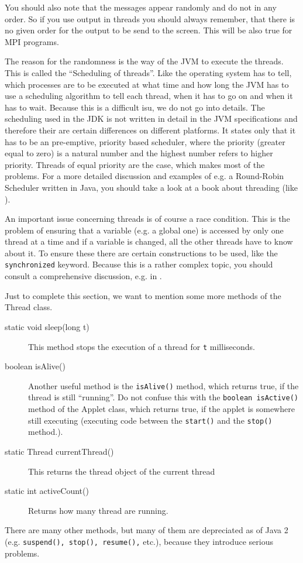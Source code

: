 You should also note that the messages appear randomly and do not in
any order. So if you use output in threads you should always remember,
that there is no given order for the output to be send to the screen. This
will be also true for MPI programs.

The reason for the randomness is the way of the JVM to execute the threads.
This is called the ``Scheduling of threads''. Like the operating
system has to tell, which processes are to be executed at what time
and how long the JVM has to use a scheduling algorithm to tell each
thread, when it has to go on and when it has to wait. Because this
is a difficult isu, we do not go into details. The scheduling used
in the JDK is not written in detail in the JVM specifications and therefore their
are certain differences on different platforms. It states only that it
has to be an pre-emptive, priority based scheduler, where the priority
(greater equal to zero) is a natural number and the highest number
refers to higher priority. Threads of equal priority are the case, which
makes most of the problems. For a more detailed discussion and examples
of e.g. a Round-Robin Scheduler written in Java,
you should take a look at a book about threading (like \cite[]{JavaThreads}).
 
An important issue concerning threads is of course a race condition. This 
is the problem of ensuring that a variable (e.g. a global one) is
accessed by only one thread at a time and if a variable is changed,
all the other threads have to know about it. To ensure these there
are certain constructions to be used, like the \verb|synchronized| keyword.
Because this is a rather complex topic, you should consult a 
comprehensive discussion, e.g. in \cite[]{JavaThreads}.   

Just to complete this section, we want to mention some more methods of
the Thread class. 
\begin{description}
\item[static void sleep(long t)] This method stops the execution of a 
  thread for \verb|t| milliseconds.
\item[boolean isAlive()] Another useful method is the \verb|isAlive()| method, which 
returns true, if the thread is still ``running''. Do not confuse this
with  the \verb|boolean isActive()| method of the Applet class, which
returns true, if the applet is somewhere still executing (executing
code between the \verb|start()| and the \verb|stop()| method.).
\item[static Thread currentThread()] This returns the thread object of the current
  thread
\item[static int activeCount()] Returns how many thread are running.
\end{description}
There are many other methods, but many of them are depreciated as of
Java 2 (e.g. \verb|suspend(), stop(), resume(),| etc.), 
because they introduce serious problems.

